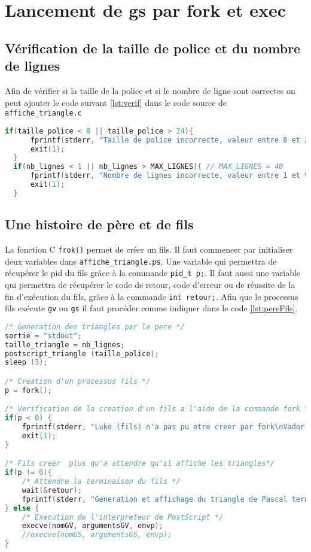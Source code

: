 \section{Lancement de gs par fork et exec}
\subsection{Vérification de la taille de police et du nombre de lignes}

Afin de vérifier si la taille de la police et si le nombre de ligne sont correctes on peut ajouter le code suivant \ref{lst:verif} dans le code source de \verb!affiche_triangle.c!

\begin{lstlisting}[language=C, label={lst:verif}, caption={Vérification de la taille de police comprise entre 8 et 24, et du nombre de lignes comprit entre 1 et 40.}]
  if(taille_police < 8 || taille_police > 24){
	  fprintf(stderr, "Taille de police incorrecte, valeur entre 8 et 24 attendue\n");
	  exit(1);
  }
  if(nb_lignes < 1 || nb_lignes > MAX_LIGNES){ // MAX_LIGNES = 40
	  fprintf(stderr, "Nombre de lignes incorrecte, valeur entre 1 et %d attendue\n", MAX_LIGNES);
	  exit(1);
  }
\end{lstlisting}

\subsection{Une histoire de père et de fils}
La fonction C \verb!frok()! permet de créer un fils. 
Il faut commencer par initialiser deux variables dans \verb!affiche_triangle.ps!. Une variable qui permettra de récupérer le pid du fils grâce à la commande \verb!pid_t p;!. Il faut aussi une variable qui permettra de récupérer le code de retour, code d'erreur ou de réussite de la fin d'exécution du fils, grâce à la commande \verb!int retour;!.
Afin que le processus fils exécute \verb!gv! ou \verb!gs! il faut procéder comme indiquer dans le code \ref{lst:pereFils}.

\begin{lstlisting}[language=C, label={lst:pereFils}, caption={Création d'un fils qui execute la fonction execve permettant la lecture du fichier PostScript par un interpréteur de PostScript.}]
/* Generation des triangles par le pere */
sortie = "stdout";
taille_triangle = nb_lignes;
postscript_triangle (taille_police);
sleep (3);

/* Creation d'un processus fils */
p = fork();

/* Verification de la creation d'un fils a l'aide de la commande fork */
if(p < 0) {
	fprintf(stderr, "Luke (fils) n'a pas pu etre creer par fork\nVador (pere) est triste\n");
	exit(1);
}

/* Fils creer  plus qu'a attendre qu'il affiche les triangles*/
if(p != 0){
	/* Attendre la terminaison du fils */
	wait(&retour);
	fprintf(stderr, "Generation et affichage du triangle de Pascal termine\n");
} else {	
	/* Execution de l'interpreteur de PostScript */
	execve(nomGV, argumentsGV, envp);
	//execve(nomGS, argumentsGS, envp);
}
\end{lstlisting}